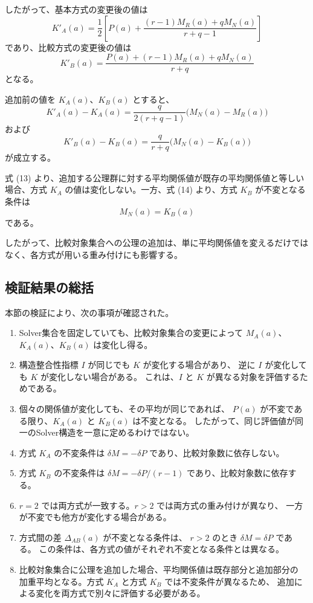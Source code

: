 \documentclass[a4paper,11pt]{ltjsarticle}
\begin{document}
したがって、基本方式の変更後の値は
\[
\boxed{
K'_A(a)=
\frac12\left[
P(a)+
\frac{(r-1)M_R(a)+qM_N(a)}{r+q-1}
\right]
}
\tag{11}
\]
であり、比較方式の変更後の値は
\[
\boxed{
K'_B(a)=
\frac{
P(a)+(r-1)M_R(a)+qM_N(a)
}{r+q}
}
\tag{12}
\]
となる。

追加前の値を $K_A(a)$、$K_B(a)$ とすると、
\[
\boxed{
K'_A(a)-K_A(a)=
\frac{q}{2(r+q-1)}
\bigl(M_N(a)-M_R(a)\bigr)
}
\tag{13}
\]
および
\[
\boxed{
K'_B(a)-K_B(a)=
\frac{q}{r+q}
\bigl(M_N(a)-K_B(a)\bigr)
}
\tag{14}
\]
が成立する。

式 (13) より、追加する公理群に対する平均関係値が既存の平均関係値と等しい場合、方式 $K_A$ の値は変化しない。一方、式 (14) より、方式 $K_B$ が不変となる条件は
\[
M_N(a)=K_B(a)
\]
である。

したがって、比較対象集合への公理の追加は、単に平均関係値を変えるだけではなく、各方式が用いる重み付けにも影響する。

\subsection{検証結果の総括}

本節の検証により、次の事項が確認された。

\begin{enumerate}
\item Solver集合を固定していても、比較対象集合の変更によって
      $M_A(a)$、$K_A(a)$、$K_B(a)$ は変化し得る。

\item 構造整合性指標 $I$ が同じでも $K$ が変化する場合があり、
      逆に $I$ が変化しても $K$ が変化しない場合がある。
      これは、$I$ と $K$ が異なる対象を評価するためである。

\item 個々の関係値が変化しても、その平均が同じであれば、
      $P(a)$ が不変である限り、$K_A(a)$ と $K_B(a)$ は不変となる。
      したがって、同じ評価値が同一のSolver構造を一意に定めるわけではない。

\item 方式 $K_A$ の不変条件は
      $\delta M=-\delta P$ であり、比較対象数に依存しない。

\item 方式 $K_B$ の不変条件は
      $\delta M=-\delta P/(r-1)$ であり、比較対象数に依存する。

\item $r=2$ では両方式が一致する。$r>2$ では両方式の重み付けが異なり、
      一方が不変でも他方が変化する場合がある。

\item 方式間の差 $\Delta_{AB}(a)$ が不変となる条件は、
      $r>2$ のとき $\delta M=\delta P$ である。
      この条件は、各方式の値がそれぞれ不変となる条件とは異なる。

\item 比較対象集合に公理を追加した場合、平均関係値は既存部分と追加部分の
      加重平均となる。方式 $K_A$ と方式 $K_B$ では不変条件が異なるため、
      追加による変化を両方式で別々に評価する必要がある。
\end{enumerate}
\end{document}
